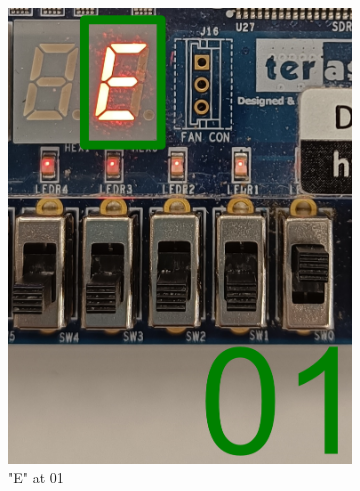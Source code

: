 \documentclass{article}
\begin{document}
\begin{figure}[h]
\begin{subfigure}{0.4\textwidth}
        \includegraphics[width=1\textwidth]{Figures/Part4-01.png}
        \caption{"E" at 01}
        \label{fig:T04pic2}
    \end{subfigure}
    \begin{subfigure}{0.4\textwidth}
        \centering

\end{subfigure}
\end{figure}
\end{document}
